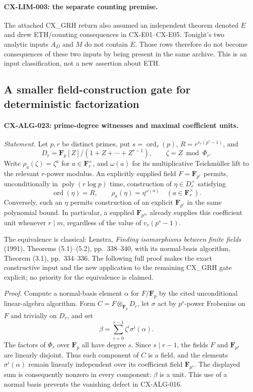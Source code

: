 \paragraph{CX-LIM-003: the separate counting premise.}
The attached CX\_GRH return also assumed an independent theorem denoted
$E$ and drew ETH/counting consequences in CX-E01--CX-E05. Tonight's two
analytic inputs $A_D$ and $M$ do not contain $E$. Those rows therefore do
not become consequences of these two inputs by being present in the same
archive. This is an input classification, not a new assertion about ETH.

\subsection{A smaller field-construction gate for deterministic factorization}

\paragraph{CX-ALG-023: prime-degree witnesses and maximal coefficient units.}
\emph{Statement.} Let $p,r$ be distinct primes, put
$s=\operatorname{ord}_r(p)$, $R=r^{v_r(p^s-1)}$, and
\[
 D_r=\mathbf F_p[Z]/(1+Z+\cdots+Z^{r-1}),\qquad \zeta=Z\bmod\Phi_r.
\]
Write $\rho_a(\zeta)=\zeta^a$ for $a\in\mathbf F_r^\times$, and
$\omega(a)$ for its multiplicative Teichm\"uller lift to the relevant
$r$-power modulus. An explicitly supplied field $F=\mathbf F_{p^r}$
permits, unconditionally in $\operatorname{poly}(r\log p)$ time,
construction of $\eta\in D_r^\times$ satisfying
\[
          \operatorname{ord}(\eta)=R,\qquad
          \rho_a(\eta)=\eta^{\omega(a)}\quad(a\in\mathbf F_r^\times).
\]
Conversely, such an $\eta$ permits construction of an explicit
$\mathbf F_{p^r}$ in the same polynomial bound. In particular, a supplied
$\mathbf F_{p^m}$ already supplies this coefficient unit whenever
$r\mid m$, regardless of the value of $v_r(p^s-1)$.

The equivalence is classical: Lenstra, \emph{Finding isomorphisms between
finite fields} (1991), Theorems (5.1)--(5.2), pp.~338--340, with its
normal-basis algorithm, Theorem (3.1), pp.~334--336. The following full
proof makes the exact constructive input and the new application to the
remaining CX\_GRH gate explicit; no priority for the equivalence is claimed.

\emph{Proof.} Compute a normal-basis element $\alpha$ for
$F/\mathbf F_p$ by the cited unconditional linear-algebra algorithm.
Form $C=F\otimes_{\mathbf F_p}D_r$, let $\sigma$ act by $p^s$-power
Frobenius on $F$ and trivially on $D_r$, and set
\[
             \beta=\sum_{i=0}^{r-1}\zeta^i\sigma^i(\alpha).
\]
The factors of $\Phi_r$ over $\mathbf F_p$ all have degree $s$.
Since $s\mid r-1$, the fields $F$ and $\mathbf F_{p^s}$ are linearly
disjoint. Thus each component of $C$ is a field, and the elements
$\sigma^i(\alpha)$ remain linearly independent over its coefficient
field $\mathbf F_{p^s}$. The displayed sum is consequently nonzero in
every component: $\beta$ is a unit. This use of a normal basis prevents
the vanishing defect in CX-ALG-016.

